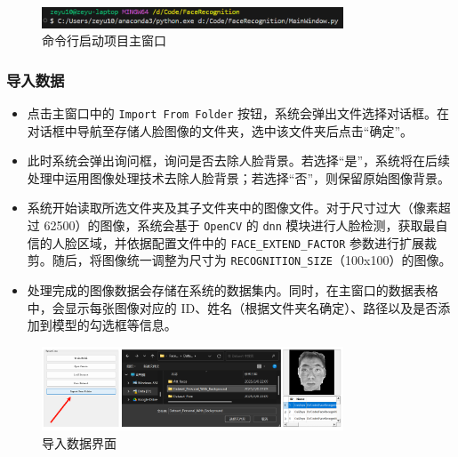 \documentclass{article}
\begin{document}
\begin{figure}[H]
    \centering
    \includegraphics[width=0.8\textwidth]{Img/PixPin_2025-03-09_00-37-52.png}
    \caption{命令行启动项目主窗口}
\end{figure}

\subsubsection{导入数据}
\begin{itemize}
    \item 点击主窗口中的 \texttt{Import From Folder} 按钮，系统会弹出文件选择对话框。在对话框中导航至存储人脸图像的文件夹，选中该文件夹后点击“确定”。
    \item 此时系统会弹出询问框，询问是否去除人脸背景。若选择“是”，系统将在后续处理中运用图像处理技术去除人脸背景；若选择“否”，则保留原始图像背景。
    \item 系统开始读取所选文件夹及其子文件夹中的图像文件。对于尺寸过大（像素超过 62500）的图像，系统会基于 \texttt{OpenCV} 的 \texttt{dnn} 模块进行人脸检测，获取最自信的人脸区域，并依据配置文件中的 \texttt{FACE\_EXTEND\_FACTOR} 参数进行扩展裁剪。随后，将图像统一调整为尺寸为 \texttt{RECOGNITION\_SIZE}（100x100）的图像。
    \item 处理完成的图像数据会存储在系统的数据集内。同时，在主窗口的数据表格中，会显示每张图像对应的 ID、姓名（根据文件夹名确定）、路径以及是否添加到模型的勾选框等信息。
\end{itemize}

\begin{figure}[H]
    \centering
    \includegraphics[width=0.8\textwidth]{Img/PixPin_2025-03-09_00-48-16.png}
    \caption{导入数据界面}
\end{figure}
\end{document}
